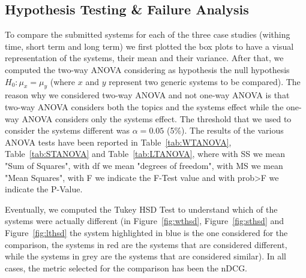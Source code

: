 \subsection{Hypothesis Testing \& Failure Analysis}
\label{subsec:hypotest}
To compare the submitted systems for each of the three case studies (withing time, short term and long term) we first plotted the box plots to have a visual representation of the systems, their mean and their variance. After that, we computed the two-way \ac{ANOVA} considering as hypothesis the null hypothesis  $H_0: \mu_x = \mu_y$ (where $x$ and $y$ represent two generic systems to be compared). The reason why we considered two-way \ac{ANOVA} and not one-way \ac{ANOVA} is that two-way \ac{ANOVA} considers both the topics and the systems effect while the one-way \ac{ANOVA} considers only the systems effect. The threshold that we used to consider the systems different was $\alpha=0.05$ (5\%). The results of the various \ac{ANOVA} tests have been reported in Table~\ref{tab:WTANOVA}, Table~\ref{tab:STANOVA} and Table~\ref{tab:LTANOVA}, where with SS we mean "Sum of Squares", with df we mean "degrees of freedom", with MS we mean "Mean Squares", with F we indicate the F-Test value and with prob>F we indicate the P-Value.
\par
Eventually, we computed the Tukey HSD Test to understand which of the systems were actually different (in Figure~\ref{fig:wthsd}, Figure~\ref{fig:sthsd} and Figure~\ref{fig:lthsd} the system highlighted in blue is the one considered for the comparison, the systems in red are the systems that are considered different, while the systems in grey are the systems that are considered similar). In all cases, the metric selected for the comparison has been the nDCG.


